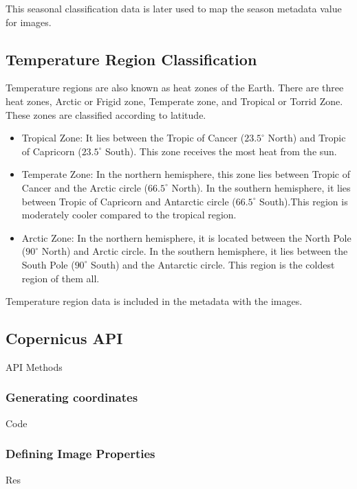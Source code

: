 This seasonal classification data is later used to map the season metadata value for images.

\subsection{Temperature Region Classification}

Temperature regions are also known as heat zones of the Earth. There are three heat zones, Arctic or Frigid zone, Temperate zone, and Tropical or Torrid Zone. These zones are classified according to latitude.

\begin{itemize}
    \item Tropical Zone: It lies between the Tropic of Cancer ($23.5^\circ$ North) and Tropic of Capricorn ($23.5^\circ$ South). This zone receives the most heat from the sun.
    \item Temperate Zone: In the northern hemisphere, this zone lies between Tropic of Cancer and the Arctic circle ($66.5^\circ$ North). In the southern hemisphere, it lies between Tropic of Capricorn and Antarctic circle ($66.5^\circ$ South).This region is moderately cooler compared to the tropical region.
    \item Arctic Zone: In the northern hemisphere, it is located between the North Pole ($90^\circ$ North) and Arctic circle. In the southern hemisphere, it lies between the South Pole ($90^\circ$ South) and the Antarctic circle. This region is the coldest region of them all.
\end{itemize}

Temperature region data is included in the metadata with the images.

\subsection{Copernicus API}

API Methods

\subsubsection{Generating coordinates}

Code

\subsubsection{Defining Image Properties}

Res

